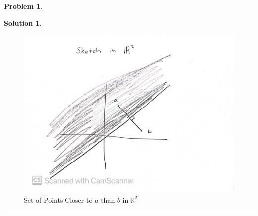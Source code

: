 \documentclass{article}
\theoremstyle{definition}
\newtheorem{problem}{Problem}
\def\fline{\rule{0.75\linewidth}{0.5pt}}
\newcommand{\finishline}{\begin{center}\fline\end{center}}
\newtheorem*{solution*}{Solution}
\newenvironment{solution}{\begin{solution*}}{{\finishline} \end{solution*}}
\begin{document}
\begin{problem}
\begin{solution}
        \begin{figure}[h!]
        \centering
        \includegraphics[width=0.6 \textwidth]{Sketchn_1.jpg}
        \caption{Set of Points Closer to $a$ than $b$ in $\mathbb{R}^2$}
    \end{figure}  
        
    \end{solution}
\end{problem}
\newpage 
\end{document}
